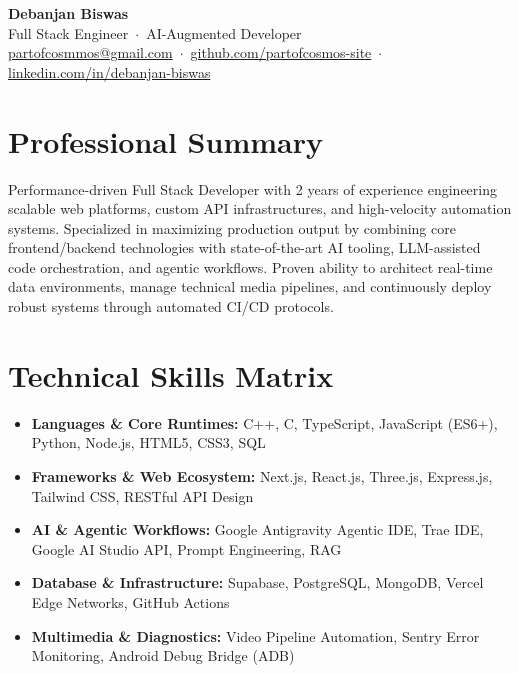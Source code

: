 \documentclass[10pt,letterpaper]{article}
\begin{document}
\begin{center}
    {\Huge \bfseries \color{primaryColor} Debanjan Biswas} \\ \vspace{3pt}
    {\large Full Stack Engineer \,$\cdot$\, AI-Augmented Developer} \\ \vspace{4pt}
    \small
    \href{mailto:partofcosmmos@gmail.com}{partofcosmmos@gmail.com} \,$\cdot$\, 
    \href{https://github.com/partofcosmos-site}{github.com/partofcosmos-site} \,$\cdot$\, 
    \href{https://linkedin.com/in/debanjan-biswas-8200573b8}{linkedin.com/in/debanjan-biswas}
\end{center}

\section{Professional Summary}
Performance-driven Full Stack Developer with 2 years of experience engineering scalable web platforms, custom API infrastructures, and high-velocity automation systems. Specialized in maximizing production output by combining core frontend/backend technologies with state-of-the-art AI tooling, LLM-assisted code orchestration, and agentic workflows. Proven ability to architect real-time data environments, manage technical media pipelines, and continuously deploy robust systems through automated CI/CD protocols.

\section{Technical Skills Matrix}
\begin{itemize}
    \item \textbf{Languages \& Core Runtimes:} C++, C, TypeScript, JavaScript (ES6+), Python, Node.js, HTML5, CSS3, SQL
    \item \textbf{Frameworks \& Web Ecosystem:} Next.js, React.js, Three.js, Express.js, Tailwind CSS, RESTful API Design
    \item \textbf{AI \& Agentic Workflows:} Google Antigravity Agentic IDE, Trae IDE, Google AI Studio API, Prompt Engineering, RAG
    \item \textbf{Database \& Infrastructure:} Supabase, PostgreSQL, MongoDB, Vercel Edge Networks, GitHub Actions
    \item \textbf{Multimedia \& Diagnostics:} Video Pipeline Automation, Sentry Error Monitoring, Android Debug Bridge (ADB)
\end{itemize}
\end{document}
